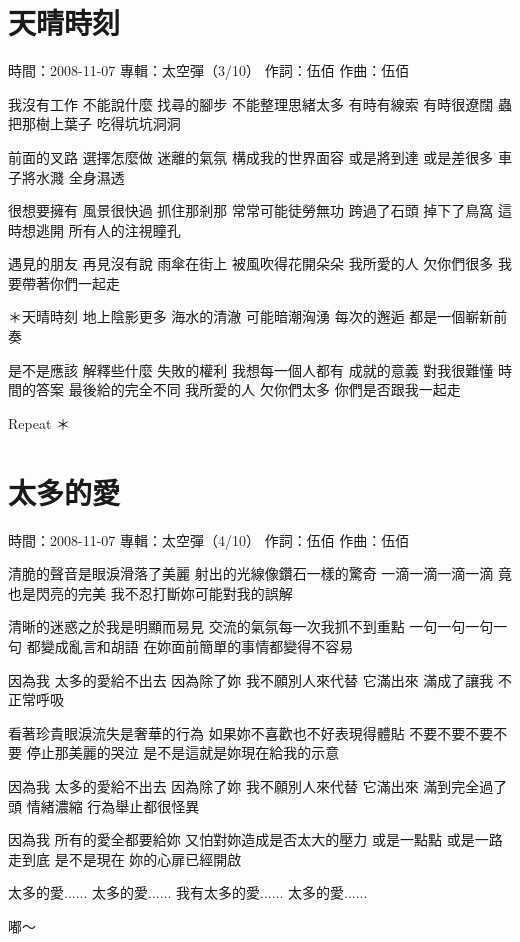 \documentclass[UTF8,a4paper,oneside,twocolumn,12pt]{ctexbook}
\newcommand{\infopair}[2]{\textbullet #1：#2}
\newcommand{\zc}[1][伍佰]{\infopair{作詞}{#1}}
\newcommand{\zq}[1][伍佰]{\infopair{作曲}{#1}}
\newcommand{\zj}[1]{\infopair{專輯}{#1}}
\newcommand{\sj}[1]{\infopair{時間}{#1}}
\newenvironment{info}{\begin{flushleft}\kaishu
	}
	{\end{flushleft}\normalsize\yahei\par}
\newenvironment{lyric}{
	}
{}
\begin{document}
\section{天晴時刻}
\begin{info}
	\sj{2008-11-07}
	\zj{太空彈（3/10）}
	\zc
	\zq
\end{info}
\begin{lyric}
	我沒有工作 不能說什麼
	找尋的腳步 不能整理思緒太多
	有時有線索 有時很遼闊
	蟲把那樹上葉子 吃得坑坑洞洞

	前面的叉路 選擇怎麼做
	迷離的氣氛 構成我的世界面容
	或是將到達 或是差很多
	車子將水濺 全身濕透

	很想要擁有 風景很快過
	抓住那剎那 常常可能徒勞無功
	跨過了石頭 掉下了鳥窩
	這時想逃開 所有人的注視瞳孔

	遇見的朋友 再見沒有說
	雨傘在街上 被風吹得花開朵朵
	我所愛的人 欠你們很多
	我要帶著你們一起走

	＊天晴時刻 地上陰影更多
	海水的清澈 可能暗潮洶湧
	每次的邂逅 都是一個嶄新前奏

	是不是應該 解釋些什麼
	失敗的權利 我想每一個人都有
	成就的意義 對我很難懂
	時間的答案 最後給的完全不同
	我所愛的人 欠你們太多
	你們是否跟我一起走

	Repeat ＊
\end{lyric}

\section{太多的愛}
\begin{info}
	\sj{2008-11-07}
	\zj{太空彈（4/10）}
	\zc
	\zq
\end{info}
\begin{lyric}
	清脆的聲音是眼淚滑落了美麗
	射出的光線像鑽石一樣的驚奇
	一滴一滴一滴一滴
	竟也是閃亮的完美
	我不忍打斷妳可能對我的誤解

	清晰的迷惑之於我是明顯而易見
	交流的氣氛每一次我抓不到重點
	一句一句一句一句
	都變成亂言和胡語
	在妳面前簡單的事情都變得不容易

	因為我 太多的愛給不出去
	因為除了妳 我不願別人來代替
	它滿出來 滿成了讓我 不正常呼吸

	看著珍貴眼淚流失是奢華的行為
	如果妳不喜歡也不好表現得體貼
	不要不要不要不要
	停止那美麗的哭泣
	是不是這就是妳現在給我的示意

	因為我 太多的愛給不出去
	因為除了妳 我不願別人來代替
	它滿出來 滿到完全過了頭
	情緒濃縮 行為舉止都很怪異

	因為我 所有的愛全都要給妳
	又怕對妳造成是否太大的壓力
	或是一點點 或是一路走到底
	是不是現在 妳的心扉已經開啟

	太多的愛...... 太多的愛......
	我有太多的愛...... 太多的愛......

	嘟～
\end{lyric}
\end{document}

